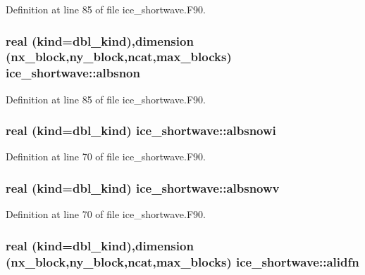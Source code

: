 Definition at line 85 of file ice\_\-shortwave.F90.\hypertarget{namespaceice__shortwave_a1f4c83d80c19fddde454cd208383656e}{
\subsubsection[{albsnon}]{\setlength{\rightskip}{0pt plus 5cm}real (kind=dbl\_\-kind),dimension (nx\_\-block,ny\_\-block,ncat,max\_\-blocks) {\bf ice\_\-shortwave::albsnon}}}
\label{namespaceice__shortwave_a1f4c83d80c19fddde454cd208383656e}


Definition at line 85 of file ice\_\-shortwave.F90.\hypertarget{namespaceice__shortwave_ae2f840e8aa9cc62828d602e4c8362127}{
\subsubsection[{albsnowi}]{\setlength{\rightskip}{0pt plus 5cm}real (kind=dbl\_\-kind) {\bf ice\_\-shortwave::albsnowi}}}
\label{namespaceice__shortwave_ae2f840e8aa9cc62828d602e4c8362127}


Definition at line 70 of file ice\_\-shortwave.F90.\hypertarget{namespaceice__shortwave_a86d6b36a69a220d505725c4696b45acb}{
\subsubsection[{albsnowv}]{\setlength{\rightskip}{0pt plus 5cm}real (kind=dbl\_\-kind) {\bf ice\_\-shortwave::albsnowv}}}
\label{namespaceice__shortwave_a86d6b36a69a220d505725c4696b45acb}


Definition at line 70 of file ice\_\-shortwave.F90.\hypertarget{namespaceice__shortwave_a8b8421d0ec544285f307d5d10d456e98}{
\subsubsection[{alidfn}]{\setlength{\rightskip}{0pt plus 5cm}real (kind=dbl\_\-kind),dimension (nx\_\-block,ny\_\-block,ncat,max\_\-blocks) {\bf ice\_\-shortwave::alidfn}}}
\label{namespaceice__shortwave_a8b8421d0ec544285f307d5d10d456e98}


